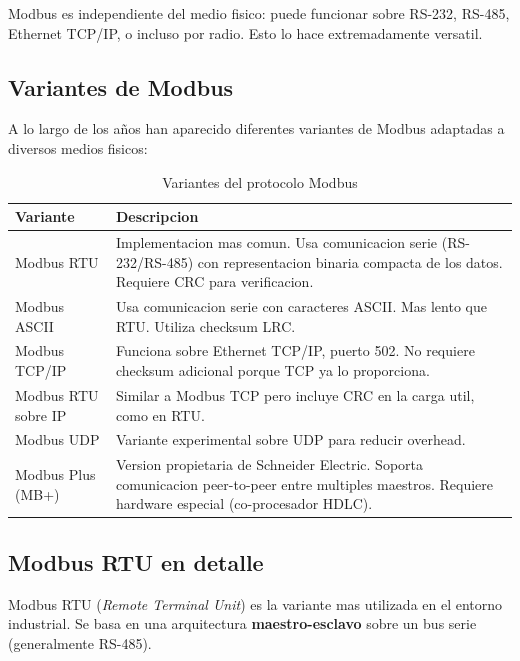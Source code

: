 Modbus es independiente del medio fisico: puede funcionar sobre RS-232,
RS-485, Ethernet TCP/IP, o incluso por radio. Esto lo hace extremadamente
versatil.

\subsection{Variantes de Modbus}

A lo largo de los años han aparecido diferentes variantes de Modbus adaptadas a
diversos medios fisicos:

\begin{table}[H]
    \centering
    \caption{Variantes del protocolo Modbus}
    \label{tab:modbus_variantes}
    \begin{tabular}{|l|p{8cm}|}
        \hline
        \textbf{Variante} & \textbf{Descripcion} \\
        \hline
        Modbus RTU & Implementacion mas comun. Usa comunicacion serie (RS-232/RS-485)
        con representacion binaria compacta de los datos. Requiere CRC para
        verificacion. \\
        \hline
        Modbus ASCII & Usa comunicacion serie con caracteres ASCII. Mas lento que
        RTU. Utiliza checksum LRC. \\
        \hline
        Modbus TCP/IP & Funciona sobre Ethernet TCP/IP, puerto 502. No requiere
        checksum adicional porque TCP ya lo proporciona. \\
        \hline
        Modbus RTU sobre IP & Similar a Modbus TCP pero incluye CRC en la carga
        util, como en RTU. \\
        \hline
        Modbus UDP & Variante experimental sobre UDP para reducir overhead. \\
        \hline
        Modbus Plus (MB+) & Version propietaria de Schneider Electric. Soporta
        comunicacion peer-to-peer entre multiples maestros. Requiere hardware
        especial (co-procesador HDLC). \\
        \hline
    \end{tabular}
\end{table}

\subsection{Modbus RTU en detalle}

Modbus RTU (\textit{Remote Terminal Unit}) es la variante mas utilizada en el
entorno industrial. Se basa en una arquitectura \textbf{maestro-esclavo} sobre
un bus serie (generalmente RS-485).

